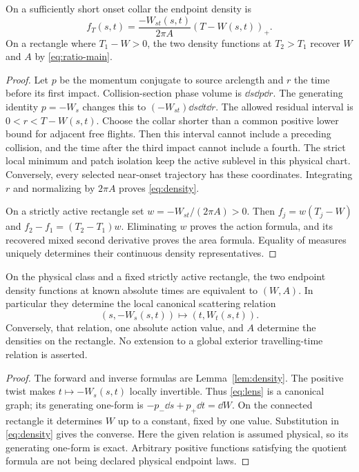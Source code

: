 \begin{lemma}\label{lem:density}
On a sufficiently short onset collar the endpoint density is
\begin{equation}\label{eq:density}
 f_T(s,t)=\frac{-W_{st}(s,t)}{2\pi A}(T-W(s,t))_+.
\end{equation}
On a rectangle where $T_1-W>0$, the two density functions at
$T_2>T_1$ recover $W$ and $A$ by \eqref{eq:ratio-main}.
\end{lemma}
\begin{proof}
Let $p$ be the momentum conjugate to source arclength and $r$ the time
before its first impact. Collision-section phase volume is
$\dd s\dd p\dd r$. The generating identity $p=-W_s$ changes this to
$(-W_{st})\dd s\dd t\dd r$. The allowed residual interval is
$0<r<T-W(s,t)$. Choose the collar shorter than a common positive lower
bound for adjacent free flights. Then this interval cannot include a
preceding collision, and the time after the third impact cannot include
a fourth. The strict local minimum and patch isolation keep the active
sublevel in this physical chart. Conversely, every selected near-onset
trajectory has these coordinates. Integrating $r$ and normalizing by
$2\pi A$ proves \eqref{eq:density}.

On a strictly active rectangle set $w=-W_{st}/(2\pi A)>0$.
Then $f_j=w(T_j-W)$ and $f_2-f_1=(T_2-T_1)w$.
Eliminating $w$ proves the action formula, and its recovered mixed
second derivative proves the area formula. Equality of measures
uniquely determines their continuous density representatives.
\end{proof}

\begin{proposition}\label{prop:lens}
On the physical class and a fixed strictly active rectangle, the two
endpoint density functions at known absolute times are equivalent to
$(W,A)$. In particular they determine the local canonical scattering
relation
\begin{equation}\label{eq:lens}
       (s,-W_s(s,t))\longmapsto(t,W_t(s,t)).
\end{equation}
Conversely, that relation, one absolute action value, and $A$ determine
the densities on the rectangle. No extension to a global exterior
travelling-time relation is asserted.
\end{proposition}
\begin{proof}
The forward and inverse formulas are Lemma~\ref{lem:density}.
The positive twist makes $t\mapsto-W_s(s,t)$ locally invertible.
Thus \eqref{eq:lens} is a canonical graph; its generating one-form is
$-p_-\dd s+p_+\dd t=\dd W$. On the connected rectangle it determines
$W$ up to a constant, fixed by one value. Substitution in
\eqref{eq:density} gives the converse. Here the given relation is assumed
physical, so its generating one-form is exact. Arbitrary positive
functions satisfying the quotient formula are not being declared
physical endpoint laws.
\end{proof}

